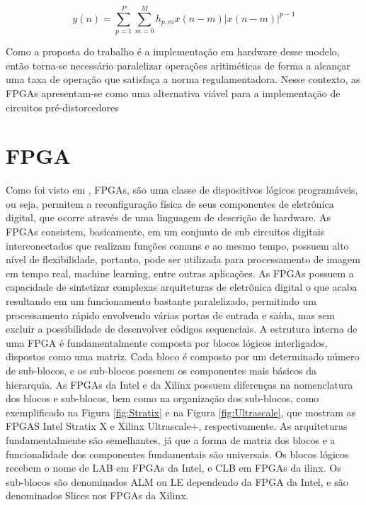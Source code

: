 \begin{equation}
    y(n) = \sum_{p=1}^{P} \sum_{m=0}^{M} h_{p,m} x(n - m) \left| x(n - m) \right|^{p-1}
    \label{eq:mp}
\end{equation}

Como a proposta do trabalho é a implementação em hardware desse modelo, então torna-se necessário paralelizar operações aritiméticas de forma a alcançar uma taxa de operação que satisfaça a norma regulamentadora. Nesse contexto, as FPGAs apresentam-se como uma alternativa viável para a implementação de circuitos pré-distorcedores 

\section{FPGA}

Como foi visto em \cite{Pedroni2010}, FPGAs, são uma classe de dispositivos lógicos programáveis, ou seja, permitem a reconfiguração física de seus componentes de eletrônica digital, que ocorre através de uma linguagem de descrição de hardware. 
As FPGAs consistem, basicamente, em um conjunto de sub circuitos digitais interconectados que realizam funções comuns e ao mesmo tempo, possuem alto nível de flexibilidade, portanto, pode ser utilizada para processamento de imagem em tempo real, machine learning, entre outras aplicações.
As FPGAs possuem a capacidade de sintetizar complexas arquiteturas de eletrônica digital o que acaba resultando em um funcionamento bastante paralelizado, permitindo um processamento rápido envolvendo várias portas de entrada e saída,
mas sem excluir a possibilidade de desenvolver códigos sequenciais.
A estrutura interna de uma FPGA é fundamentalmente composta por blocos lógicos interligados, dispostos como uma matriz. Cada bloco é composto por um determinado número de sub-blocos, e os sub-blocos possuem os componentes mais básicos da hierarquia. As FPGAs da Intel e da Xilinx possuem diferenças na nomenclatura dos blocos e sub-blocos, bem como na organização dos sub-blocos,
como exemplificado na Figura \ref{fig:Stratix} e na Figura \ref{fig:Ultrascale}, que mostram as FPGAS Intel Stratix X e Xilinx Ultrascale+, respectivamente. As arquiteturas fundamentalmente são semelhantes, já que a forma de matriz dos blocos e a funcionalidade dos componentes fundamentais são universais. Os blocos lógicos recebem o nome de LAB em FPGAs da Intel, e CLB em FPGAs da  ilinx. Os sub-blocos são denominados ALM ou LE dependendo da FPGA da Intel, e são denominados Slices nos FPGAs da Xilinx.

